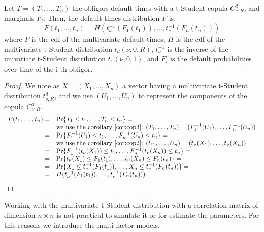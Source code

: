 \documentclass[11pt,fleqn]{book} %
\begin{document}
\begin{proposition}
\label{prop:dtd}
Let $T=(T_1,\dots,T_n)$ the obligors default times with a t-Student copula 
$C_{\nu,R}^d$, and marginals $F_i$. 
Then, the default times distribution $F$ is:
\begin{displaymath}
F(t_1,\dots,t_n) = H\left(t_\nu^{-1}(F_1(t_1)), \dots, t_\nu^{-1}(F_n(t_n))\right)
\end{displaymath}
where $F$ is the cdf of the multivariate default times, $H$ is the cdf of 
the multivariate t-Student distribution $t_d(\nu,0,R)$, $t_\nu^{-1}$ is the 
inverse of the univariate t-Student distribution $t_1(\nu,0,1)$, and $F_i$ 
is the default probabilities over time of the i-th obligor.
\end{proposition}
\begin{proof}
We note as $X=(X_1,\dots,X_n)$ a vector having a multivariate t-Student
distribution $t_{\nu,R}^d$, and we use $(U_1,\dots,U_n)$ to represent
the components of the copula $C_{\nu,R}^d$.
\begin{displaymath}
\begin{array}{rl}
F(t_1,\dots,t_n) = & \Pr\{ T_1 \le t_1 , \dots, T_n \le t_n \} = \\
  & \text{we use the corollary \ref{cor:cop3}: }
    (T_1,\dots,T_n) = (F_1^{-1}(U_1),\dots,F_n^{-1}(U_n)) \\
= & \Pr\{ F_1^{-1}(U_1) \le t_1 , \dots , F_n^{-1}(U_n) \le t_n \} = \\
  & \text{we use the corollary \ref{cor:cop2}: }
  (U_1,\dots,U_n) = (t_\nu(X_1),\dots,t_\nu(X_n)) \\
= & \Pr\{ F_1^{-1}(t_\nu(X_1)) \le t_1 , \dots , F_n^{-1}(t_\nu(X_n)) \le t_n \} = \\
= & \Pr\{ t_\nu(X_1) \le F_1(t_1) , \dots , t_\nu(X_n) \le F_n(t_n) \} = \\
= & \Pr\{ X_1 \le t_\nu^{-1}(F_1(t_1)) , \dots , X_n \le t_\nu^{-1}(F_n(t_n)) \} = \\
= & H(t_\nu^{-1}(F_1(t_1)), \dots, t_\nu^{-1}(F_n(t_n))) \\
\end{array}
\end{displaymath}
\end{proof}

Working with the multivariate t-Student distribution with a correlation
matrix of dimension $n \times n$ is not practical to simulate it or for
estimate the parameters. For this reasons we introduce the multi-factor 
models.
\end{document}
